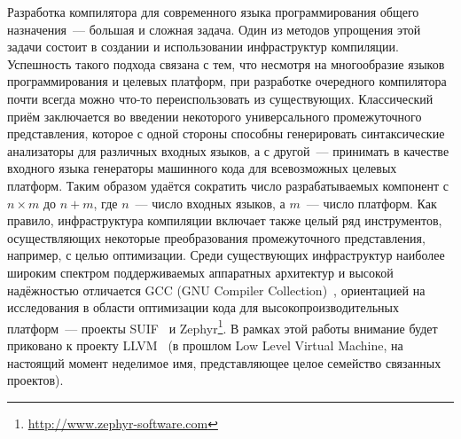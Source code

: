 \documentclass[a4paper, 12pt]{article}
\begin{document}
Разработка компилятора для современного языка программирования общего назначения~--- большая и сложная задача. Один из
методов упрощения этой задачи состоит в создании и использовании инфраструктур компиляции. Успешность такого подхода
связана с тем, что несмотря на многообразие языков программирования и целевых платформ, при разработке очередного
компилятора почти всегда можно что-то переиспользовать из существующих. Классический приём заключается во введении
некоторого универсального промежуточного представления, которое с одной стороны способны генерировать синтаксические
анализаторы для различных входных языков, а с другой~--- принимать в качестве входного языка генераторы машинного кода
для всевозможных целевых платформ. Таким образом удаётся сократить число разрабатываемых компонент с $n \times m$ до
$n + m$, где $n$~--- число входных языков, а $m$~--- число платформ. Как правило, инфраструктура компиляции включает
также целый ряд инструментов, осуществляющих некоторые преобразования промежуточного представления, например, с целью
оптимизации. Среди существующих инфраструктур наиболее широким спектром поддерживаемых аппаратных архитектур и высокой
надёжностью отличается GCC (GNU Compiler Collection)~\cite{Dgccman, GCCints}, ориентацией на исследования в области
оптимизации кода для высокопроизводительных платформ~--- проекты SUIF~\cite{SUIF} и
Zephyr\footnote{\url{http://www.zephyr-software.com}}. В рамках этой работы внимание будет приковано к проекту
LLVM~\cite{LLVM} (в прошлом Low Level Virtual Machine, на настоящий момент неделимое имя, представляющее целое
семейство связанных проектов).
\end{document}

